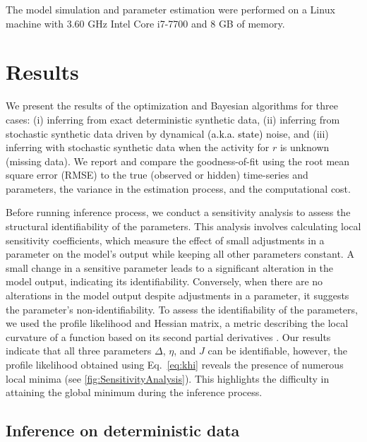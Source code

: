 \documentclass[12pt]{article}
\begin{document}
The model simulation and parameter estimation were performed on a Linux machine with 3.60 GHz Intel Core i7-7700 and 8 GB of memory.



\section{Results}
\label{Results}

We present the results of the optimization and Bayesian algorithms for three cases: (i) inferring from exact deterministic synthetic data, (ii) inferring from stochastic synthetic data driven by dynamical \textcolor{black}{(a.k.a. state)} noise, and (iii) inferring with stochastic synthetic data when the activity for $r$ is unknown (missing data).  We report and compare the goodness-of-fit using the root mean square error (RMSE) to the true (observed or hidden) time-series and parameters, the variance in the estimation process, and the computational cost.


Before running inference process, we conduct a sensitivity analysis to assess the structural identifiability of the parameters. This analysis involves calculating local sensitivity coefficients, which measure the effect of small adjustments in a parameter on the model's output while keeping all other parameters constant. A small change in a sensitive parameter leads to a significant alteration in the model output, indicating its identifiability. Conversely, when there are no alterations in the model output despite adjustments in a parameter, it suggests the parameter's non-identifiability. To assess the identifiability of the parameters, we used the profile likelihood \citep{Raue2009, Wieland2021} and Hessian matrix, a metric describing the local curvature of a function based on its second partial derivatives \citep{Hashemi2018, Hashemi2023}. Our results indicate that all three parameters $\Delta$, $\eta$, and $J$ can be identifiable, however, the profile likelihood obtained using Eq.~\ref{eq:khi} reveals the presence of numerous local minima (see \autoref{fig:SensitivityAnalysis}). This highlights the difficulty in attaining the global minimum during the inference process.


\subsection{Inference on deterministic data}
\end{document}
